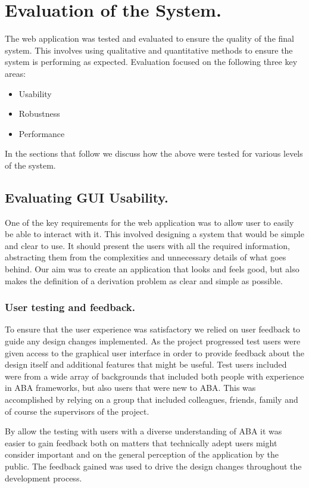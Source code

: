 \newpage

\chapter{Evaluation of the System.}
The web application was tested and evaluated to ensure the quality of the final system. This involves using qualitative and quantitative methods to ensure the system is performing as expected. Evaluation focused on the following three key areas:

\begin{itemize}
\item Usability
\item Robustness
\item Performance
\end{itemize}

In the sections that follow we discuss how the above were tested for various levels of the system.

\section{Evaluating GUI Usability.}
One of the key requirements for the web application was to allow user to easily be able to interact with it. This involved designing a system that would be simple and clear to use. It should present the users with all the required information, abstracting them from the complexities and unnecessary details of what goes behind. Our aim was to create an application that looks and feels good, but also makes the definition of a derivation problem as clear and simple as possible.

\subsection{User testing and feedback.}
To ensure that the user experience was satisfactory we relied on user feedback to guide any design changes implemented. As the project progressed test users were given access to the graphical user interface in order to provide feedback about the design itself and additional features that might be useful. Test users included were from a wide array of backgrounds that included both people with experience in ABA frameworks, but also users that were new to ABA. This was accomplished  by relying on a group that included colleagues, friends, family and of course the supervisors of the project.

By allow the testing with users with a diverse understanding of ABA it was easier to gain feedback both on matters that technically adept users might consider important and on the general perception of the application by the public. The feedback gained was used to drive the design changes throughout the development process.

